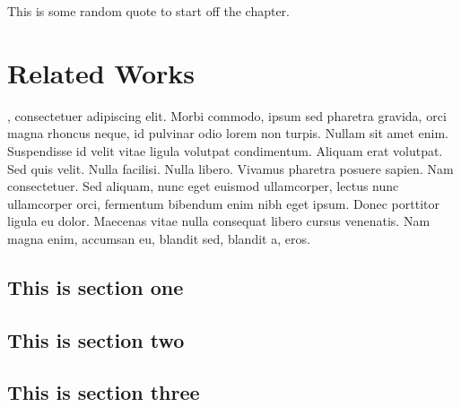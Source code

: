 \begin{savequote}[75mm] 
This is some random quote to start off the chapter.
\end{savequote}

\chapter{Related Works}

, consectetuer adipiscing elit. Morbi commodo, ipsum sed pharetra gravida, orci magna rhoncus neque, id pulvinar odio lorem non turpis. Nullam sit amet enim. Suspendisse id velit vitae ligula volutpat condimentum. Aliquam erat volutpat. Sed quis velit. Nulla facilisi. Nulla libero. Vivamus pharetra posuere sapien. Nam consectetuer. Sed aliquam, nunc eget euismod ullamcorper, lectus nunc ullamcorper orci, fermentum bibendum enim nibh eget ipsum. Donec porttitor ligula eu dolor. Maecenas vitae nulla consequat libero cursus venenatis. Nam magna enim, accumsan eu, blandit sed, blandit a, eros.

\section{This is section one}
\blindtext

\section{This is section two}
\blindtext

\section{This is section three}
\blindtext